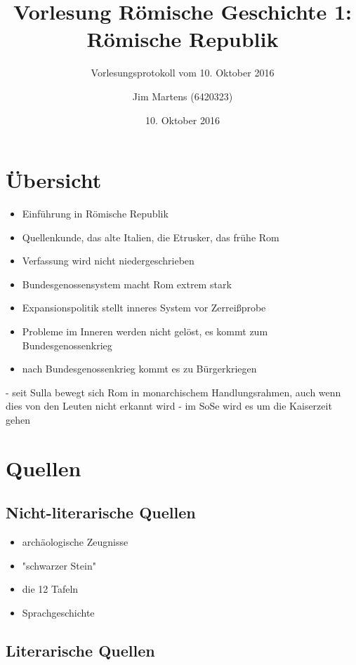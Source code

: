 \documentclass[10pt,a4paper,oneside,ngerman,numbers=noenddot]{scrartcl}
\newenvironment{myitemize}{\begin{itemize}\itemsep -9pt}{\end{itemize}} %
\begin{document}
\author{Jim Martens (6420323)}
\title{Vorlesung Römische Geschichte 1: Römische Republik}
\subtitle{Vorlesungsprotokoll vom 10. Oktober 2016}
\date{10. Oktober 2016}
\maketitle

\section*{Übersicht}
\begin{myitemize}
\item Einführung in Römische Republik
\item Quellenkunde, das alte Italien, die Etrusker, das frühe Rom
\item Verfassung wird nicht niedergeschrieben
\item Bundesgenossensystem macht Rom extrem stark
\item Expansionspolitik stellt inneres System vor Zerreißprobe
\item Probleme im Inneren werden nicht gelöst, es kommt zum Bundesgenossenkrieg
\item nach Bundesgenossenkrieg kommt es zu Bürgerkriegen
\end{myitemize}
- seit Sulla bewegt sich Rom in monarchischem Handlungsrahmen, auch wenn dies von den Leuten nicht erkannt wird
- im SoSe wird es um die Kaiserzeit gehen

\section*{Quellen}
\subsection*{Nicht-literarische Quellen}
\begin{myitemize}
    \item archäologische Zeugnisse
    \item "schwarzer Stein"
    \item die 12 Tafeln
    \item Sprachgeschichte
\end{myitemize}
\subsection*{Literarische Quellen}
\end{document}
